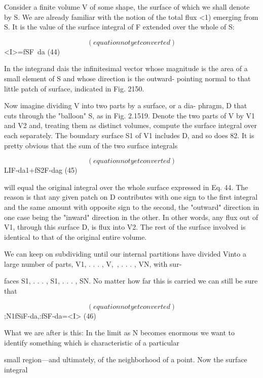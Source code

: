 Consider a finite volume V of some shape, the surface of which we
shall denote by S. We are already familiar with the notion of the total
flux <1) emerging from S. It is the value of the surface integral of F
extended over the whole of S:

\begin{equation}
(equation not yet converted)
\end{equation}
<I>=fSF~da (44)

In the integrand dais the infinitesimal vector whose magnitude is the
area of a small element of S and whose direction is the outward-
pointing normal to that little patch of surface, indicated in Fig. 2150.

Now imagine dividing V into two parts by a surface, or a dia-
phragm, D that cuts through the "balloon" S, as in Fig. 2.1519.
Denote the two parts of V by V1 and V2 and, treating them as distinct
volumes, compute the surface integral over each separately. The
boundary surface S1 of V1 includes D, and so does 82. It is pretty
obvious that the sum of the two surface integrals

\begin{equation}
(equation not yet converted)
\end{equation}
LIF-da1+fS2F-dag (45)

will equal the original integral over the whole surface expressed in
Eq. 44. The reason is that any given patch on D contributes with
one sign to the first integral and the same amount with opposite sign
to the second, the "outward" direction in one case being the "inward"
direction in the other. In other words, any flux out of V1, through
this surface D, is flux into V2. The rest of the surface involved is
identical to that of the original entire volume.

We can keep on subdividing until our internal partitions have
divided Vinto a large number of parts, V1, . . . , V,~, . . . , VN, with sur-

faces S1, . . . , S1, . . . , SN. No matter how far this is carried we can
still be sure that

\begin{equation}
(equation not yet converted)
\end{equation}
;N1fSiF-da,:fSF-da=<I> (46)

What we are after is this: In the limit as N becomes enormous we
want to identify something which is characteristic of a particular

small region---and ultimately, of the neighborhood of a point. Now
the surface integral

